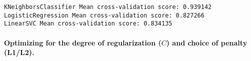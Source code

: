 \documentclass[11pt]{article}
\begin{document}
    \begin{Verbatim}[commandchars=\\\{\}]
KNeighborsClassifier Mean cross-validation score: 0.939142
LogisticRegression Mean cross-validation score: 0.827266
LinearSVC Mean cross-validation score: 0.834135

    \end{Verbatim}

    \paragraph{\texorpdfstring{Optimizing for the degree of regularization
(\(C\)) and choice of penalty
(L1/L2).}{Optimizing for the degree of regularization (C) and choice of penalty (L1/L2).}}\label{optimizing-for-the-degree-of-regularization-c-and-choice-of-penalty-l1l2.}
\end{document}
